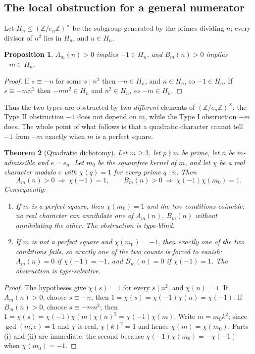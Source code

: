 \documentclass[11pt,reqno]{amsart}
\theoremstyle{plain}
\newtheorem{theorem}{Theorem}[section]
\newtheorem{proposition}[theorem]{Proposition}
\theoremstyle{definition}
\numberwithin{equation}{section}
\newcommand{\Z}{\mathbb{Z}}
\begin{document}
\subsection{The local obstruction for a general numerator}
Let $H_{n}\le(\Z/e_{n}\Z)^{\times}$ be the subgroup generated by the primes dividing
$n$; every divisor of $n^{2}$ lies in $H_{n}$, and $n\in H_{n}$.

\begin{proposition}\label{prop:groupm}
$A_{m}(n)>0$ implies $-1\in H_{n}$, and $B_{m}(n)>0$ implies $-m\in H_{n}$.
\end{proposition}

\begin{proof}
If $s\equiv-n$ for some $s\mid n^{2}$ then $-n\in H_{n}$, and $n\in H_{n}$, so
$-1\in H_{n}$. If $s\equiv-mn^{2}$ then $-mn^{2}\in H_{n}$ and $n^{2}\in H_{n}$, so
$-m\in H_{n}$.
\end{proof}

Thus the two types are obstructed by two \emph{different} elements of
$(\Z/e_{n}\Z)^{\times}$: the Type II obstruction $-1$ does not depend on $m$, while the
Type I obstruction $-m$ does. The whole point of what follows is that a quadratic
character cannot tell $-1$ from $-m$ exactly when $m$ is a perfect square.

\begin{theorem}[Quadratic dichotomy]\label{thm:dich}
Let $m\ge3$, let $p\nmid m$ be prime, let $n$ be $m$-admissible and $e=e_{n}$. Let
$m_{0}$ be the squarefree kernel of $m$, and let $\chi$ be a \emph{real} character
modulo $e$ with $\chi(q)=1$ for every prime $q\mid n$. Then
\[
  A_{m}(n)>0\ \Longrightarrow\ \chi(-1)=1,
  \qquad
  B_{m}(n)>0\ \Longrightarrow\ \chi(-1)\chi(m_{0})=1 .
\]
Consequently:
\begin{enumerate}
\item[(i)] If $m$ is a perfect square, then $\chi(m_{0})=1$ and the two conditions
coincide: no real character can annihilate one of $A_{m}(n)$, $B_{m}(n)$ without
annihilating the other. The obstruction is \emph{type-blind}.
\item[(ii)] If $m$ is not a perfect square and $\chi(m_{0})=-1$, then exactly one of
the two conditions fails, so exactly one of the two counts is forced to vanish:
$A_{m}(n)=0$ if $\chi(-1)=-1$, and $B_{m}(n)=0$ if $\chi(-1)=1$. The obstruction is
\emph{type-selective}.
\end{enumerate}
\end{theorem}

\begin{proof}
The hypotheses give $\chi(s)=1$ for every $s\mid n^{2}$, and $\chi(n)=1$. If
$A_{m}(n)>0$, choose $s\equiv-n$; then $1=\chi(s)=\chi(-1)\chi(n)=\chi(-1)$. If
$B_{m}(n)>0$, choose $s\equiv-mn^{2}$; then
$1=\chi(s)=\chi(-1)\chi(m)\chi(n)^{2}=\chi(-1)\chi(m)$. Write $m=m_{0}k^{2}$; since
$\gcd(m,e)=1$ and $\chi$ is real, $\chi(k)^{2}=1$ and hence
$\chi(m)=\chi(m_{0})$. Parts (i) and (ii) are immediate, the second because
$\chi(-1)\chi(m_{0})=-\chi(-1)$ when $\chi(m_{0})=-1$.
\end{proof}
\end{document}
